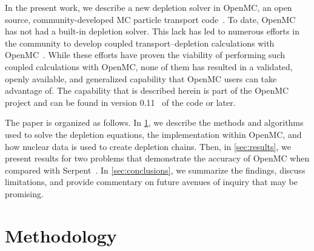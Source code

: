 \documentclass[3p,authoryear]{elsarticle}
\begin{document}
In the present work, we describe a new depletion solver in OpenMC, an open
source, community-developed MC particle transport code~\citep{romano2015ane1}.
To date, OpenMC has not had a built-in depletion solver. This lack has led to
numerous efforts in the community to develop coupled transport--depletion
calculations with OpenMC~\citep{gul2017ane, lanversin2017icone,
lanversin2019phd, liu2019nst, zhuang2020pne, zhao2020ned, zhao2020cpc,
zhang2020ane}. While these efforts have proven the viability of performing such
coupled calculations with OpenMC, none of them has resulted in a validated,
openly available, and generalized capability that OpenMC users can take
advantage of. The capability that is described herein is part of the OpenMC
project and can be found in version 0.11~\citep{openmc-0110} of the code or
later.

The paper is organized as follows. In \cref{sec:methods}, we describe the
methods and algorithms used to solve the depletion equations, the implementation
within OpenMC, and how nuclear data is used to create depletion chains. Then, in
\cref{sec:results}, we present results for two problems that demonstrate the
accuracy of OpenMC when compared with Serpent~\citep{leppanen2015ane}. In
\cref{sec:conclusions}, we summarize the findings, discuss limitations, and
provide commentary on future avenues of inquiry that may be promising.

\section{Methodology}
\label{sec:methods}
\end{document}

